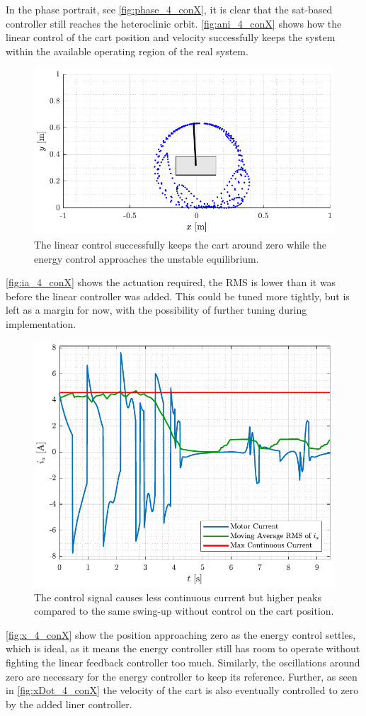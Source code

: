 %
In the phase portrait, see \autoref{fig:phase_4_conX}, it is clear that the sat-based controller still reaches the heteroclinic orbit.
\autoref{fig:ani_4_conX} shows how the linear control of the cart position and velocity successfully keeps the system within the available operating region of the real system.
%
\begin{figure}[H]
  \includegraphics[width=.52\textwidth]{figures/ani_4_conX}
  \caption{The linear control successfully keeps the cart around zero while the energy control approaches the unstable equilibrium.}
  \label{fig:ani_4_conX}
\end{figure}
%
\autoref{fig:ia_4_conX} shows the actuation required, the RMS is lower than it was before the linear controller was added. This could be tuned more tightly, but is left as a margin for now, with the possibility of further tuning during implementation.
%
\begin{figure}[H]
  \includegraphics[width=.52\textwidth]{figures/ia_4_conX}
  \caption{The control signal causes less continuous current but higher peaks compared to the same swing-up without control on the cart position.}
  \label{fig:ia_4_conX}
\end{figure}
%
\autoref{fig:x_4_conX} show the position approaching zero as the energy control settles, which is ideal, as it means the energy controller still has room to operate without fighting the linear feedback controller too much. Similarly, the oscillations around zero are necessary for the energy controller to keep its reference. Further, as seen in \autoref{fig:xDot_4_conX} the velocity of the cart is also eventually controlled to zero by the added liner controller.
